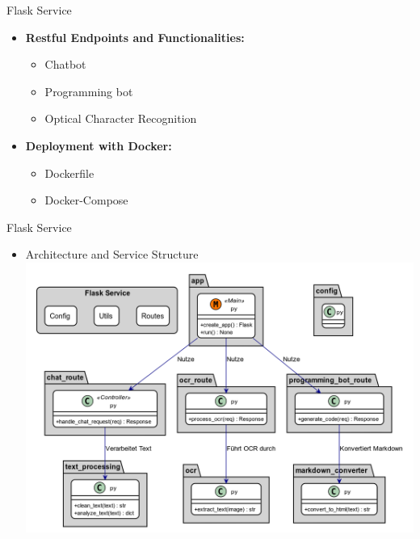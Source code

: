 \documentclass{beamer}
\begin{document}
\begin{frame}{Flask Service}
  \begin{itemize}
    \item \textbf{Restful Endpoints and Functionalities:}
    \begin{itemize}
      \item Chatbot 
      \item Programming bot
      \item Optical Character Recognition 
    \end{itemize}
    \item \textbf{Deployment with Docker:}
    \begin{itemize}
      \item Dockerfile
      \item Docker-Compose
    \end{itemize}
  \end{itemize}
\end{frame}

\begin{frame}{Flask Service}
  \begin{itemize}
    \item Architecture and Service Structure
    \includegraphics[width=\textwidth]{flask_service.png}
  \end{itemize}
\end{frame}
\end{document}
